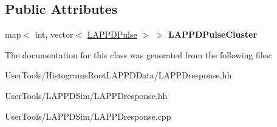 \subsection*{Public Attributes}
\begin{DoxyCompactItemize}
\item 
\hypertarget{classLAPPDresponse_ae10b5dcda1903b993df6891d60b1e0d4}{map$<$ int, vector$<$ \hyperlink{classLAPPDPulse}{L\-A\-P\-P\-D\-Pulse} $>$ $>$ {\bfseries L\-A\-P\-P\-D\-Pulse\-Cluster}}\label{classLAPPDresponse_ae10b5dcda1903b993df6891d60b1e0d4}

\end{DoxyCompactItemize}


The documentation for this class was generated from the following files\-:\begin{DoxyCompactItemize}
\item 
User\-Tools/\-Histograms\-Root\-L\-A\-P\-P\-D\-Data/L\-A\-P\-P\-Dresponse.\-hh\item 
User\-Tools/\-L\-A\-P\-P\-D\-Sim/L\-A\-P\-P\-Dresponse.\-hh\item 
User\-Tools/\-L\-A\-P\-P\-D\-Sim/L\-A\-P\-P\-Dresponse.\-cpp\end{DoxyCompactItemize}
